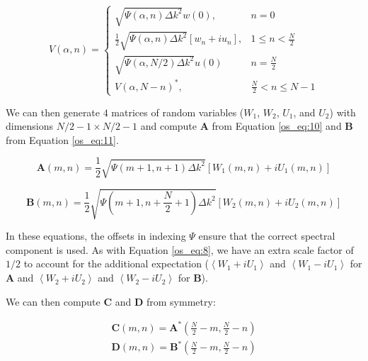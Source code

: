 \begin{equation}
  \label{os_eq:9a}   
  V(\alpha,n) = \begin{cases}
    \sqrt{\Psi(\alpha,n)\Delta k^2}w(0), & n = 0 \\
    \frac{1}{2}\sqrt{\Psi(\alpha,n)\Delta k^2}\left[w_n + iu_n \right], & 1 \leq n < \frac{N}{2} \\
   \sqrt{\Psi(\alpha,N/2)\Delta k^2}u(0) & n = \frac{N}{2} \\
    V(\alpha,N-n)^*, &  \frac{N}{2} < n \leq N-1 
  \end{cases} 
\end{equation}
\renewcommand{\baselinestretch}{2} \small\normalsize

We can then generate $4$ matrices of random variables ($W_1$, $W_2$, $U_1$, and $U_2$) with dimensions $N/2 - 1 \times N/2- 1$ and compute $\mathbf{A}$ from Equation \ref{os_eq:10} and $\mathbf{B}$ from Equation \ref{os_eq:11}.

\begin{equation}
\label{os_eq:10}
\mathbf{A}(m,n) = \frac{1}{2}\sqrt{\Psi(m+1,n+1)\Delta k^2}\left[W_1(m,n) + iU_1(m,n) \right]
\end{equation}

\begin{equation}
\label{os_eq:11}
\mathbf{B}(m,n) = \frac{1}{2}\sqrt{\Psi(m+ 1,n+\frac{N}{2} +1)\Delta k^2}\left[W_2(m,n) + iU_2(m,n) \right]
\end{equation}

In these equations, the offsets in indexing $\Psi$ ensure that the correct spectral component is used. As with Equation \ref{os_eq:8}, we have an extra scale factor of $1/2$ to account for the additional expectation ($\left<W_1 + iU_1\right>$ and $\left<W_1 - iU_1\right>$ for $\mathbf{A}$ and $\left<W_2 + iU_2\right>$ and $\left<W_2 - iU_2\right>$ for $\mathbf{B}$).

We can then compute $\mathbf{C}$ and $\mathbf{D}$ from symmetry:

\begin{equation}
\label{os_eq:12}
\begin{gathered}
\mathbf{C}(m,n) = \mathbf{A}^*\left(\frac{N}{2} - m, \frac{N}{2} - n \right) \\
\mathbf{D}(m,n) = \mathbf{B}^*\left(\frac{N}{2} - m, \frac{N}{2} - n \right) \\
\end{gathered}
\end{equation}
\renewcommand{\baselinestretch}{2} \small\normalsize

